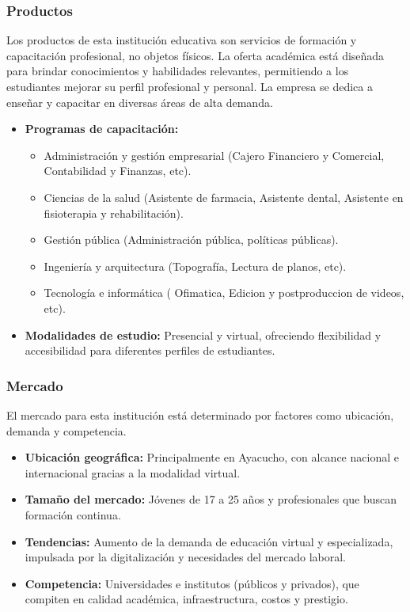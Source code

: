 \documentclass[stu, 12pt,letterpaper,donotrepeattitle,floatsintext,natbib]{apa7}
\begin{document}
	\subsubsection{Productos}
	Los productos de esta institución educativa son servicios de formación y capacitación profesional, no objetos físicos. La oferta académica está diseñada para brindar conocimientos y habilidades relevantes, permitiendo a los estudiantes mejorar su perfil profesional y personal. La empresa se dedica a enseñar y capacitar en diversas áreas de alta demanda.
	
	\begin{itemize}
		\item \textbf{Programas de capacitación:}
		
		\begin{itemize}
			\item Administración y gestión empresarial (Cajero Financiero y Comercial, Contabilidad y Finanzas, etc).
			\item Ciencias de la salud (Asistente de farmacia, Asistente dental, Asistente en fisioterapia y rehabilitación).
			\item Gestión pública (Administración pública, políticas públicas).
			\item Ingeniería y arquitectura (Topografía, Lectura de planos, etc).
			\item Tecnología e informática ( Ofimatica, Edicion y postproduccion de videos, etc).
		\end{itemize}
		
		
		\item \textbf{Modalidades de estudio:} Presencial y virtual, ofreciendo flexibilidad y accesibilidad para diferentes perfiles de estudiantes.
	\end{itemize}
	
	\subsubsection{Mercado}
	El mercado para esta institución está determinado por factores como ubicación, demanda y competencia.
	
	\begin{itemize}
		\item \textbf{Ubicación geográfica:} Principalmente en Ayacucho, con alcance nacional e internacional gracias a la modalidad virtual.
		\item \textbf{Tamaño del mercado:} Jóvenes de 17 a 25 años y profesionales que buscan formación continua.
		\item \textbf{Tendencias:} Aumento de la demanda de educación virtual y especializada, impulsada por la digitalización y necesidades del mercado laboral.
		\item \textbf{Competencia:} Universidades e institutos (públicos y privados), que compiten en calidad académica, infraestructura, costos y prestigio.
	\end{itemize}
	
\end{document}
